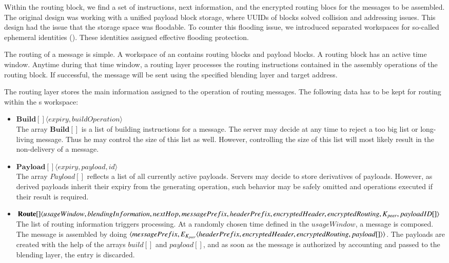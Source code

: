 Within the routing block, we find a set of instructions, next \VortexNodes information, and the encrypted routing blocs for the messages to be assembled. The original design was working with a unified payload block storage, where UUIDs of blocks solved collision and addressing issues. This design had the issue that the storage space was floodable. To counter this flooding issue, we introduced separated workspaces for so-called ephemeral identities (). These identities assigned effective flooding protection.

The routing of a message is simple. A workspace of an  contains routing blocks and payload blocks. A routing block has an active time window. Anytime during that time window, a routing layer processes the routing instructions contained in the assembly operations of the routing block. If successful, the message will be sent using the specified blending layer and target address.

The routing layer stores the main information assigned to the operation of routing messages. The following data has to be kept for routing within the s workspace:
\begin{itemize}
	\item $\mathbf{Build[]}\langle expiry, buildOperation \rangle$\\
	The array $\mathbf{Build[]}$ is a list of building instructions for a message. The server may decide at any time to reject a too big list or long-living message. Thus he may control the size of this list as well. However, controlling the size of this list will most likely result in the non-delivery of a message. 
	\item $\mathbf{Payload[]}\langle expiry, payload, id \rangle$\\
	The array $Payload[]$ reflects a list of all currently active payloads. Servers may decide to store derivatives of payloads. However, as derived payloads inherit their expiry from the generating operation, such behavior may be safely omitted and operations executed if their result is required.
	\item $\splitatcommas{\mathbf{Route[]}\langle usageWindow, blendingInformation, nextHop, messagePrefix, headerPrefix, encryptedHeader, encryptedRouting, K_{peer}, payloadID[] \rangle}$\\
	The list of routing information triggers processing. At a randomly chosen time defined in the $usageWindow$, a message is composed. The message is assembled by doing $\splitatcommas{\langle messagePrefix, E_{K_{peer}}\langle headerPrefix, encryptedHeader, encryptedRouting, payload[] \rangle \rangle}$. The payloads are created with the help of the arrays $build[]$ and $payload[]$, and as soon as the message is authorized by accounting and passed to the blending layer, the entry is discarded.
\end{itemize}

